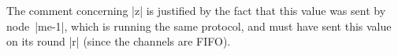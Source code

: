 \begin{answerI}
%
The comment concerning |z| is justified by the fact that this value was sent
by node~|me-1|, which is running the same protocol, and must have sent this
value on its round |r| (since the channels are FIFO). 
\end{answerI}
